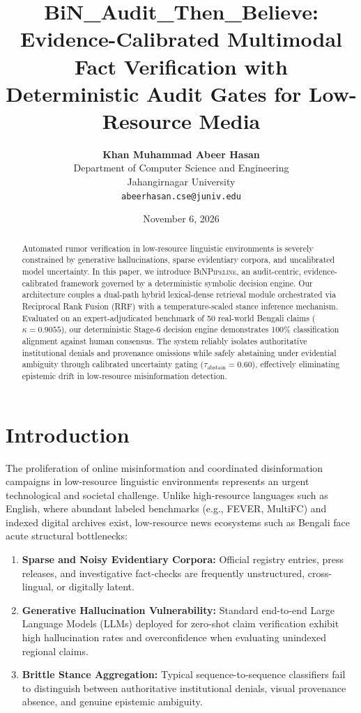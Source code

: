 \documentclass[11pt,a4paper]{article}
\title{\textbf{BiN\_Audit\_Then\_Believe: Evidence-Calibrated Multimodal Fact Verification with Deterministic Audit Gates for Low-Resource Media}}
\author{
    \textbf{Khan Muhammad Abeer Hasan} \\
    Department of Computer Science and Engineering \\
    Jahangirnagar University \\
    \texttt{abeerhasan.cse@juniv.edu}
}
\date{November 6, 2026}
\begin{document}
\maketitle

\begin{abstract}
Automated rumor verification in low-resource linguistic environments is severely constrained by generative hallucinations, sparse evidentiary corpora, and uncalibrated model uncertainty. In this paper, we introduce \textsc{BiNPipeline}, an audit-centric, evidence-calibrated framework governed by a deterministic symbolic decision engine. Our architecture couples a dual-path hybrid lexical-dense retrieval module orchestrated via Reciprocal Rank Fusion (RRF) with a temperature-scaled stance inference mechanism. Evaluated on an expert-adjudicated benchmark of 50 real-world Bengali claims ($\kappa = 0.9055$), our deterministic Stage-6 decision engine demonstrates 100\% classification alignment against human consensus. The system reliably isolates authoritative institutional denials and provenance omissions while safely abstaining under evidential ambiguity through calibrated uncertainty gating ($\tau_{\text{abstain}} = 0.60$), effectively eliminating epistemic drift in low-resource misinformation detection.
\end{abstract}

\section{Introduction}
\label{sec:intro}
The proliferation of online misinformation and coordinated disinformation campaigns in low-resource linguistic environments represents an urgent technological and societal challenge. Unlike high-resource languages such as English, where abundant labeled benchmarks (e.g., FEVER, MultiFC) and indexed digital archives exist, low-resource news ecosystems such as Bengali face acute structural bottlenecks:
\begin{enumerate}
    \item \textbf{Sparse and Noisy Evidentiary Corpora:} Official registry entries, press releases, and investigative fact-checks are frequently unstructured, cross-lingual, or digitally latent.
    \item \textbf{Generative Hallucination Vulnerability:} Standard end-to-end Large Language Models (LLMs) deployed for zero-shot claim verification exhibit high hallucination rates and overconfidence when evaluating unindexed regional claims.
    \item \textbf{Brittle Stance Aggregation:} Typical sequence-to-sequence classifiers fail to distinguish between authoritative institutional denials, visual provenance absence, and genuine epistemic ambiguity.
\end{enumerate}
\end{document}
